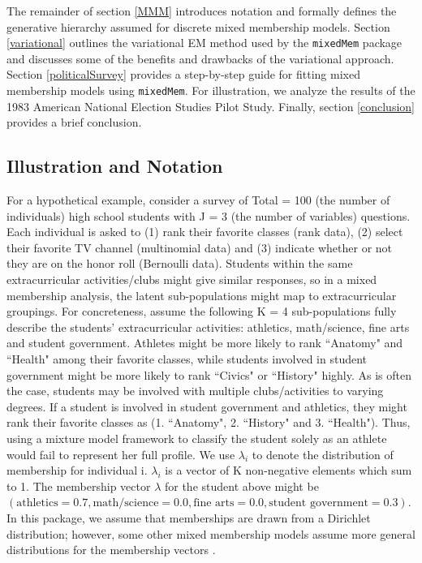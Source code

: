 \documentclass{article}\usepackage[]{graphicx}\usepackage[]{color}
\begin{document}
The remainder of section \ref{MMM} introduces notation and formally defines the generative hierarchy assumed for discrete mixed membership models. Section \ref{variational} outlines the variational EM  method used by the \texttt{mixedMem} package and discusses some of the benefits and drawbacks of the variational approach. Section \ref{politicalSurvey} provides a step-by-step guide for fitting mixed membership models using \texttt{mixedMem}. For illustration, we analyze the results of the 1983 American National Election Studies Pilot Study. Finally, section \ref{conclusion} provides a brief conclusion.

\subsection{Illustration and Notation}
For a hypothetical example, consider a survey of Total =  100 (the number of individuals) high school students with J = 3 (the number of variables) questions. Each individual is asked to (1) rank their favorite classes (rank data), (2) select their favorite TV channel (multinomial data) and (3) indicate whether or not they are on the honor roll (Bernoulli data). Students within the same extracurricular activities/clubs might give similar responses, so in a mixed membership analysis, the latent sub-populations might map to extracurricular groupings. For concreteness, assume the following K = 4 sub-populations fully describe the students' extracurricular activities: athletics, math/science, fine arts and student government. Athletes might be more likely to rank ``Anatomy" and ``Health" among their favorite classes, while students involved in student government might be more likely to rank ``Civics" or ``History" highly.  As is often the case, students may be involved with multiple clubs/activities to varying degrees. If a student is involved in student government and athletics, they might rank their favorite classes as (1. ``Anatomy", 2. ``History" and 3. ``Health"). Thus, using a mixture model framework to classify the student solely as an athlete would fail to represent her full profile. We use $\lambda_i$ to denote the distribution of membership for individual i. $\lambda_i$ is a vector of K non-negative elements which sum to 1. The membership vector $\lambda$ for the student above might be $\left(\text{athletics} = 0.7, \text{math/science} = 0.0, \text{fine arts} = 0.0, \text{student government} = 0.3\right)$. In this package, we assume that memberships are drawn from a Dirichlet distribution; however, some other mixed membership models assume more general distributions for the membership vectors \citep{blei2006correlated}.
\end{document}
